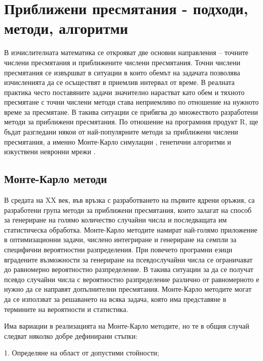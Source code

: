\newpage
\chapter{Приближени пресмятания - подходи, методи, алгоритми}
\label{chapter10}
\thispagestyle{empty}

В изчислителната математика се открояват две основни направления – точните числени пресмятания и приближените числени пресмятания. Точни числени пресмятания се извършват в ситуации в които обемът на задачата позволява изчисленията да се осъществят в приемлив интервал от време. В реалната практика често поставяните задачи значително нарастват като обем и тяхното пресмятане с точни числени методи става неприемливо по отношение на нужното време за пресмятане. В такива ситуации се прибягва до множеството разработени методи за приближени пресмятания. По отношение на програмния продукт R, ще бъдат разгледани някои от най-популярните методи за приближени числени пресмятания, а именно Монте-Карло симулации \cite{montecarlo}, генетични алгоритми \cite{ga} и изкуствени невронни мрежи \cite{ann}.

\section{Монте-Карло методи}

В средата на XX век, във връзка с разработването на първите ядрени оръжия, са разработени група методи за приближени пресмятания, които залагат на способ за генериране на голямо количество случайни числа и последващата им статистическа обработка. Монте-Карло методите намират най-голямо приложение в оптимизационни задачи, числено интегриране и генериране на семпли за специфични вероятностни разпределения. При повечето програмни езици вградените възможности за генериране на псевдослучайни числа се ограничават до равномерно вероятностно разпределение. В такива ситуации за да се получат псевдо случайни числа с вероятностно разпределение различно от равномерното е нужно да се направят допълнителни пресмятания. Монте-Карло методите могат да се използват за решаването на всяка задача, която има представяне в термините на вероятности и статистика. 

Има вариации в реализацията на Монте-Карло методите, но те в общия случай следват няколко добре дефинирани стъпки:

1. Определяне на област от допустими стойности;

